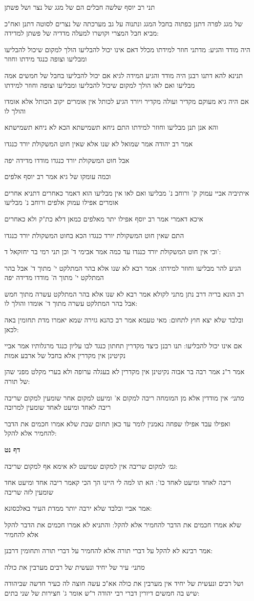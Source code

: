 \documentclass[12pt, openany]{book}
\newcommand{\sethebfont}{
\fontsize{10.5pt}{21.0pt} \selectfont
}
\newcommand{\textblock}[1]{
{\sethebfont #1\\}	
}
\newcommand{\sectname}{}
\newcommand{\newsection}[1]{
	\addcontentsline{toc}{section}{#1}
	\renewcommand{\sectname}{#1}	
	\vspace{-\baselineskip}
	\begin{center}
		\textbf{%
\fontsize{16pt}{16pt}\selectfont
			#1}
	\end{center}
	\vspace{-\baselineskip}
	\nopagebreak
}
\begin{document}
\textblock{תני רב יוסף שלשה חבלים הם של מגג של נצר ושל פשתן}
\textblock{של מגג לפרה דתנן כפתוה בחבל המגג ונתנוה על גב מערכתה של נצרים לסוטה דתנן ואח"כ מביא חבל המצרי וקושרו למעלה מדדיה של פשתן למדידה:}
\textblock{היה מודד והגיע: מדתני חוזר למידתו מכלל דאם אינו יכול להבליעו הולך למקום שיכול להבליעו ומבליעו וצופה כנגד מידתו וחוזר}
\textblock{תנינא להא דתנו רבנן היה מודד והגיע המידה לגיא אם יכול להבליעו בחבל של חמשים אמה מבליעו ואם לאו הולך למקום שיכול להבליעו ומבליעו וצופה וחוזר למידתו}
\textblock{אם היה גיא מעוקם מקדיר ועולה מקדיר ויורד הגיע לכותל אין אומרים יקוב הכותל אלא אומדו והולך לו}
\textblock{והא אנן תנן מבליעו וחוזר למידתו התם ניחא תשמישתא הכא לא ניחא תשמישתא}
\textblock{אמר רב יהודה אמר שמואל לא שנו אלא שאין חוט המשקולת יורד כנגדו}
\textblock{אבל חוט המשקולת יורד כנגדו מודדו מדידה יפה}
\textblock{וכמה עומקו של גיא אמר רב יוסף אלפים}
\textblock{איתיביה אביי עמוק ק' ורוחב נ' מבליעו ואם לאו אין מבליעו הוא דאמר כאחרים דתניא אחרים אומרים אפילו עמוק אלפים ורוחב נ' מבליעו}
\textblock{איכא דאמרי אמר רב יוסף אפילו יתר מאלפים כמאן דלא כת"ק ולא כאחרים}
\textblock{התם שאין חוט המשקולת יורד כנגדו הכא בחוט המשקולת יורד כנגדו}
\textblock{וכי אין חוט המשקולת יורד כנגדו עד כמה אמר אבימי ד' וכן תני רמי בר יחזקאל ד':}
\textblock{הגיע להר מבליעו וחוזר למידתו: אמר רבא לא שנו אלא בהר המתלקט י' מתוך ד' אבל בהר המתלקט י' מתוך ה' מודדו מדידה יפה}
\textblock{רב הונא בריה דרב נתן מתני לקולא אמר רבא לא שנו אלא בהר המתלקט עשרה מתוך חמש אבל בהר המתלקט עשרה מתוך ד' אומדו והולך לו:}
\textblock{ובלבד שלא יצא חוץ לתחום: מאי טעמא אמר רב כהנא גזירה שמא יאמרו מדת תחומין באה לכאן:}
\textblock{אם אינו יכול להבליעו: תנו רבנן כיצד מקדרין תחתון כנגד לבו עליון כנגד מרגלותיו אמר אביי נקיטינן אין מקדרין אלא בחבל של ארבע אמות}
\textblock{אמר ר"נ אמר רבה בר אבוה נקיטינן אין מקדרין לא בעגלה ערופה ולא בערי מקלט מפני שהן של תורה:}
\textblock{{\large\emph{מתני׳}} אין מודדין אלא מן המומחה ריבה למקום א' ומיעט למקום אחר שומעין למקום שריבה ריבה לאחד ומיעט לאחד שומעין למרובה}
\textblock{ואפילו עבד אפילו שפחה נאמנין לומר עד כאן תחום שבת שלא אמרו חכמים את הדבר להחמיר אלא להקל:}
\newsection{דף נט}
\textblock{{\large\emph{גמ׳}} למקום שריבה אין למקום שמיעט לא אימא אף למקום שריבה:}
\textblock{ריבה לאחד ומיעט לאחד כו': הא תו למה לי היינו הך הכי קאמר ריבה אחד ומיעט אחד שומעין לזה שריבה}
\textblock{אמר אביי ובלבד שלא ירבה יותר ממדת העיר באלכסונא:}
\textblock{שלא אמרו חכמים את הדבר להחמיר אלא להקל: והתניא לא אמרו חכמים את הדבר להקל אלא להחמיר}
\textblock{אמר רבינא לא להקל על דברי תורה אלא להחמיר על דברי תורה ותחומין דרבנן:}
\textblock{{\large\emph{מתני׳}} עיר של יחיד ונעשית של רבים מערבין את כולה}
\textblock{ושל רבים ונעשית של יחיד אין מערבין את כולה אא"כ עשה חוצה לה כעיר חדשה שביהודה שיש בה חמשים דיורין דברי רבי יהודה ר"ש אומר ג' חצירות של שני בתים:}
\end{document}
